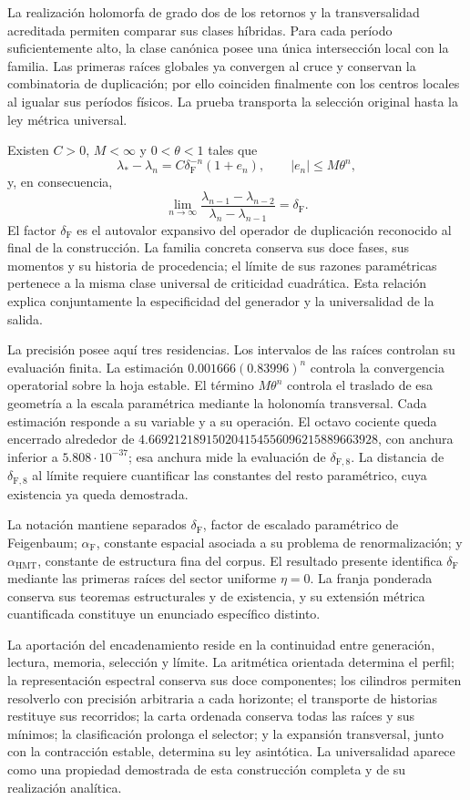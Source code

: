 La realización holomorfa de grado dos de los retornos y la transversalidad
acreditada permiten comparar sus clases híbridas. Para cada período
suficientemente alto, la clase canónica posee una única intersección local
con la familia. Las primeras raíces globales ya convergen al cruce y
conservan la combinatoria de duplicación; por ello coinciden finalmente
con los centros locales al igualar sus períodos físicos. La prueba
transporta la selección original hasta la ley métrica universal.

Existen \(C>0\), \(M<\infty\) y \(0<\theta<1\) tales que
\[
\lambda_*-\lambda_n=C\delta_{\mathrm F}^{-n}(1+e_n),
\qquad |e_n|\le M\theta^n,
\]
y, en consecuencia,
\[
\lim_{n\to\infty}
\frac{\lambda_{n-1}-\lambda_{n-2}}
{\lambda_n-\lambda_{n-1}}=\delta_{\mathrm F}.
\]
El factor \(\delta_{\mathrm F}\) es el autovalor expansivo del operador de duplicación
reconocido al final de la construcción. La familia concreta conserva sus
doce fases, sus momentos y su historia de procedencia; el límite de sus
razones paramétricas pertenece a la misma clase universal de criticidad
cuadrática. Esta relación explica conjuntamente la especificidad del
generador y la universalidad de la salida.

La precisión posee aquí tres residencias. Los intervalos de las raíces
controlan su evaluación finita. La estimación
\(0.001666(0.83996)^n\) controla la convergencia operatorial sobre la hoja
estable. El término \(M\theta^n\) controla el traslado de esa geometría a
la escala paramétrica mediante la holonomía transversal. Cada estimación
responde a su variable y a su operación. El octavo cociente queda encerrado
alrededor de \(4.669212189150204154556096215889663928\), con anchura inferior
a \(5.808\cdot10^{-37}\); esa anchura mide la evaluación de \(\delta_{\mathrm F,8}\).
La distancia de \(\delta_{\mathrm F,8}\) al límite requiere cuantificar las constantes
del resto paramétrico, cuya existencia ya queda demostrada.

La notación mantiene separados \(\delta_{\mathrm F}\), factor de escalado paramétrico
de Feigenbaum; \(\alpha_{\mathrm F}\), constante espacial asociada a su
problema de renormalización; y \(\alpha_{\mathrm{HMT}}\), constante de
estructura fina del corpus. El resultado presente identifica \(\delta_{\mathrm F}\)
mediante las primeras raíces del sector uniforme \(\eta=0\). La franja
ponderada conserva sus teoremas estructurales y de existencia, y su extensión
métrica cuantificada constituye un enunciado específico distinto.

La aportación del encadenamiento reside en la continuidad entre generación,
lectura, memoria, selección y límite. La aritmética orientada determina el
perfil; la representación espectral conserva sus doce componentes; los
cilindros permiten resolverlo con precisión arbitraria a cada horizonte;
el transporte de historias restituye sus recorridos; la carta ordenada
conserva todas las raíces y sus mínimos; la clasificación prolonga el
selector; y la expansión transversal, junto con la contracción estable,
determina su ley asintótica. La universalidad aparece como una propiedad
demostrada de esta construcción completa y de su realización analítica.
